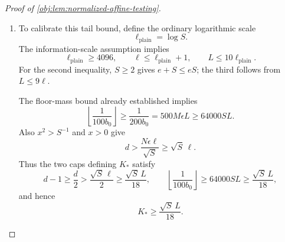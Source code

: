 \begin{proof}[Proof of \cref{obj:lem:normalized-affine-testing}]
\begin{enumerate}
The normalization identity is
\[
\tau_\iota-t_\iota^{\mathrm{tar}}
=(Z_\iota^{\mathrm{tar}}-t_\iota^{\mathrm{tar}})
+\tau_\iota(1-Q).
\]
Since \(0\le\tau_\iota\le1\), squaring and integrating yields
\[
\begin{aligned}
\mathbb E_{\nu_{\mathrm{lat}}}
(\tau_\iota-t_\iota^{\mathrm{tar}})^2
&\le2\operatorname{Var}(Z_\iota^{\mathrm{tar}})
   +2\operatorname{Var}(Q)\\
&\le4K_*b_0^2+8K_*B\alpha.
\end{aligned}
\]
Markov's inequality at the positive radius \(\Delta_{\mathrm{tar}}/8\), together with
\(\Delta_{\mathrm{tar}}\ge K_*b_0/12\), gives
\[
\begin{aligned}
\nu_{\mathrm{lat}}\left\{
|\tau_\iota-t_\iota^{\mathrm{tar}}|
\ge\frac{\Delta_{\mathrm{tar}}}{8}\right\}
&\le
\frac{64(4K_*b_0^2+8K_*B\alpha)}
     {\Delta_{\mathrm{tar}}^2}\\
&\le\frac{36864+7372800\epsilon^2L^2}{K_*}\\
&\le\frac{2^{23}(1+\epsilon^2L^2)}{K_*}.
\end{aligned}
\]
The middle estimate uses the tuning identity
\[
B\alpha=100\epsilon^2L^2b_0^2.
\]

\item
To calibrate this tail bound, define the ordinary logarithmic scale
\[
\ell_{\mathrm{plain}}=\log S.
\]
The information-scale assumption implies
\[
\ell_{\mathrm{plain}}\ge4096,\qquad
\ell\le\ell_{\mathrm{plain}}+1,\qquad
L\le10\ell_{\mathrm{plain}}.
\]
For the second inequality, \(S\ge2\) gives \(e+S\le eS\); the third follows from \(L\le9\ell\).

The floor-mass bound already established implies
\[
\left\lfloor\frac1{100b_0}\right\rfloor
\ge\frac1{200b_0}=500M\epsilon L
\ge64000SL.
\]
Also \(x^2>S^{-1}\) and \(x>0\) give
\[
d>\frac{N\epsilon\ell}{\sqrt S}\ge\sqrt S\,\ell.
\]
Thus the two caps defining \(K_*\) satisfy
\[
d-1\ge\frac d2>\frac{\sqrt S\,\ell}{2}
\ge\frac{\sqrt S\,L}{18},
\qquad
\left\lfloor\frac1{100b_0}\right\rfloor
\ge64000SL\ge\frac{\sqrt S\,L}{18},
\]
and hence
\[
K_*\ge\frac{\sqrt S\,L}{18}.
\]


\end{enumerate}
\end{proof}
